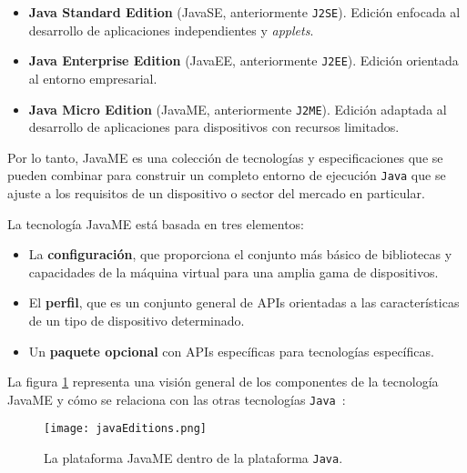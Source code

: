 \begin{itemize}
\item \textbf{Java Standard Edition} (\acs{JavaSE}, anteriormente
\texttt{J2SE}). Edición enfocada al desarrollo de aplicaciones independientes y
\emph{applets}.
\item \textbf{Java Enterprise Edition} (\acs{JavaEE}, anteriormente
\texttt{J2EE}). Edición orientada al entorno empresarial.
\item \textbf{Java Micro Edition} (\acs{JavaME}, anteriormente \texttt{J2ME}). 
Edición adaptada al desarrollo de aplicaciones para dispositivos con recursos 
limitados.
\end{itemize}

Por lo tanto, \acs{JavaME} es una colección de tecnologías y especificaciones
que se pueden combinar para construir un completo entorno de ejecución
\texttt{Java} que se ajuste a los requisitos de un dispositivo o sector del 
mercado en particular.

La tecnología \acs{JavaME} está basada en tres elementos:
\begin{itemize}
\item La \textbf{configuración}, que proporciona el conjunto más básico de
bibliotecas y capacidades de la máquina virtual para una amplia gama de
dispositivos.
\item El \textbf{perfil}, que es un conjunto general de \acs{API}s orientadas a
las características de un tipo de dispositivo determinado.
\item Un \textbf{paquete opcional} con \acs{API}s específicas para tecnologías
específicas.
\end{itemize}

La figura \ref{fig:javaEditions} representa una visión general de los
componentes de la tecnología \acs{JavaME} y cómo se relaciona con las otras
tecnologías \texttt{Java}~\cite{bib:jmeOracle}:

  \begin{figure}[H]
    \begin{center}
      \texttt{[image: javaEditions.png]}
      \caption{La plataforma \acs{JavaME} dentro de la plataforma
      \texttt{Java}.}
      \label{fig:javaEditions}
    \end{center}
  \end{figure}

